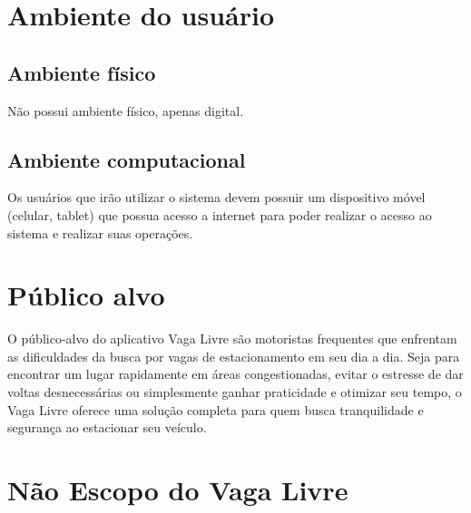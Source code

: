 \documentclass[a4paper,12pt]{article}
\begin{document}
\section{Ambiente do usuário}


\subsection{Ambiente físico}

    Não possui ambiente físico, apenas digital.

\subsection{Ambiente computacional}

    Os usuários que irão utilizar o sistema devem possuir um dispositivo móvel (celular, tablet) que possua acesso a internet para poder realizar o acesso ao sistema e realizar suas operações.

\section{Público alvo}

    O público-alvo do aplicativo Vaga Livre são motoristas frequentes que enfrentam as dificuldades da busca por vagas de estacionamento em seu dia a dia. Seja para encontrar um lugar rapidamente em áreas congestionadas, evitar o estresse de dar voltas desnecessárias ou simplesmente ganhar praticidade e otimizar seu tempo, o Vaga Livre oferece uma solução completa para quem busca tranquilidade e segurança ao estacionar seu veículo.

\section{Não Escopo do Vaga Livre}
\end{document}
